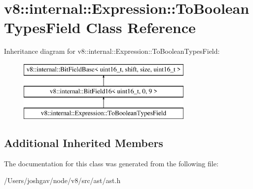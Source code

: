 \hypertarget{classv8_1_1internal_1_1_expression_1_1_to_boolean_types_field}{}\section{v8\+:\+:internal\+:\+:Expression\+:\+:To\+Boolean\+Types\+Field Class Reference}
\label{classv8_1_1internal_1_1_expression_1_1_to_boolean_types_field}
Inheritance diagram for v8\+:\+:internal\+:\+:Expression\+:\+:To\+Boolean\+Types\+Field\+:\begin{figure}[H]
\begin{center}
\leavevmode
\includegraphics[height=3.000000cm]{classv8_1_1internal_1_1_expression_1_1_to_boolean_types_field}
\end{center}
\end{figure}
\subsection*{Additional Inherited Members}


The documentation for this class was generated from the following file\+:\begin{DoxyCompactItemize}
\item 
/\+Users/joshgav/node/v8/src/ast/ast.\+h\end{DoxyCompactItemize}
